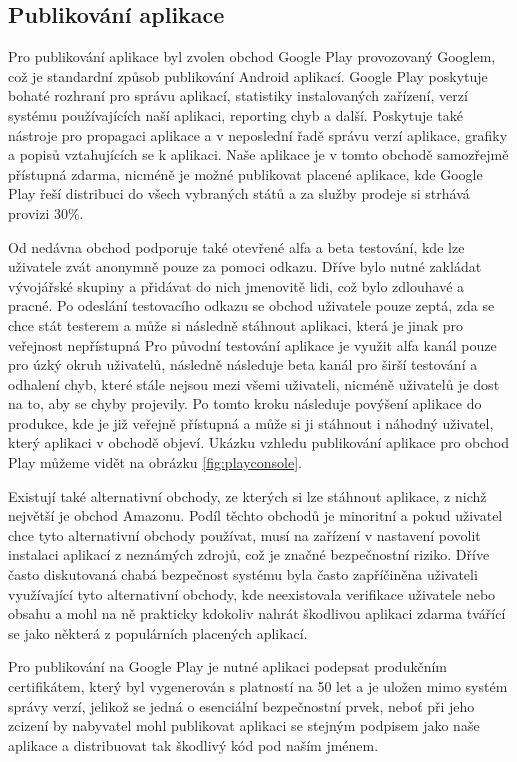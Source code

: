 \documentclass[czech,master,public,dept460,male,java,cpdeclaration]{diploma}
\begin{document}
\subsection{Publikování aplikace}
Pro publikování aplikace byl zvolen obchod Google Play provozovaný Googlem, což je standardní způsob
publikování Android aplikací. Google Play poskytuje bohaté rozhraní pro správu aplikací, statistiky
instalovaných zařízení, verzí systému používajících naší aplikaci, reporting chyb a další. Poskytuje také
nástroje pro propagaci aplikace a v neposlední řadě správu verzí aplikace, grafiky a popisů
vztahujících se k aplikaci. Naše aplikace je v tomto obchodě samozřejmě přístupná zdarma, nicméně
je možné publikovat placené aplikace, kde Google Play řeší distribuci do všech vybraných států a za služby
prodeje si strhává provizi 30\%.

Od nedávna obchod podporuje také otevřené alfa a beta testování, kde lze uživatele zvát anonymně
pouze za pomoci odkazu. Dříve bylo nutné zakládat vývojářské skupiny a přidávat do nich jmenovitě
lidi, což bylo zdlouhavé a pracné. Po odeslání testovacího odkazu se obchod uživatele pouze zeptá,
zda se chce stát testerem a může si následně stáhnout aplikaci, která je jinak pro veřejnost nepřístupná
Pro původní testování aplikace je využit alfa kanál pouze pro úzký okruh uživatelů, následně následuje beta
kanál pro širší testování a odhalení chyb, které stále nejsou mezi všemi uživateli, nicméně uživatelů je
dost na to, aby se chyby projevily. Po tomto kroku následuje povýšení aplikace do produkce, kde je již
veřejně přístupná a může si ji stáhnout i náhodný uživatel, který aplikaci v obchodě objeví. Ukázku
vzhledu publikování aplikace pro obchod Play můžeme vidět na obrázku \ref{fig:playconsole}.

Existují také alternativní obchody, ze kterých si lze stáhnout aplikace, z nichž největší je obchod Amazonu.
Podíl těchto obchodů je minoritní a pokud uživatel chce tyto alternativní obchody používat,
musí na zařízení v nastavení povolit instalaci aplikací z neznámých zdrojů, což je značné bezpečnostní
riziko. Dříve často diskutovaná chabá bezpečnost systému byla často zapříčiněna uživateli využívající
tyto alternativní obchody, kde neexistovala verifikace uživatele nebo obsahu a mohl na ně prakticky
kdokoliv nahrát škodlivou aplikaci zdarma tvářící se jako některá z populárních placených aplikací.

Pro publikování na Google Play je nutné aplikaci podepsat produkčním certifikátem, který byl
vygenerován s platností na 50 let a je uložen mimo systém správy verzí, jelikož se jedná o esenciální
bezpečnostní prvek, neboť při jeho zcizení by nabyvatel mohl publikovat aplikaci se stejným podpisem
jako naše aplikace a distribuovat tak škodlivý kód pod naším jménem.
\end{document}
